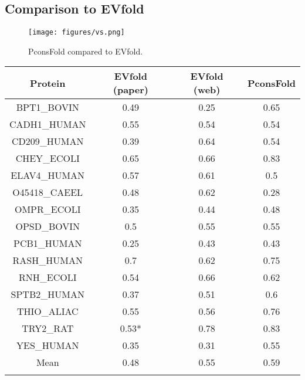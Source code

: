 \documentclass{bioinfo}
\begin{document}
\subsection{Comparison to EVfold}

\begin{figure}[!tpb]%
    \centerline{\texttt{[image: figures/vs.png]}}
\caption{PconsFold compared to EVfold.}\label{fig:vs}
\end{figure}

\begin{table}[!t]
{\begin{tabular}{cccc}\toprule
    Protein      & EVfold (paper) & EVfold (web) & PconsFold \\ \midrule
    BPT1\_BOVIN  & 0.49   & 0.25           & 0.65      \\
    CADH1\_HUMAN & 0.55   & 0.54           & 0.54      \\
    CD209\_HUMAN & 0.39   & 0.64           & 0.54      \\
    CHEY\_ECOLI  & 0.65   & 0.66           & 0.83      \\
    ELAV4\_HUMAN & 0.57   & 0.61           & 0.5       \\
    O45418\_CAEEL & 0.48   & 0.62           & 0.28      \\
    OMPR\_ECOLI  & 0.35   & 0.44           & 0.48      \\
    OPSD\_BOVIN  & 0.5    & 0.55           & 0.55      \\
    PCB1\_HUMAN  & 0.25   & 0.43           & 0.43      \\
    RASH\_HUMAN  & 0.7    & 0.62           & 0.75      \\
    RNH\_ECOLI   & 0.54   & 0.66           & 0.62      \\
    SPTB2\_HUMAN & 0.37   & 0.51           & 0.6       \\
    THIO\_ALIAC  & 0.55   & 0.56           & 0.76      \\
    TRY2\_RAT    & 0.53*  & 0.78           & 0.83      \\
    YES\_HUMAN   & 0.35   & 0.31           & 0.55      \\ \midrule
    Mean         & 0.48   & 0.55           & 0.59      \\ \botrule
\end{tabular}}{}
\end{table}
\end{document}
